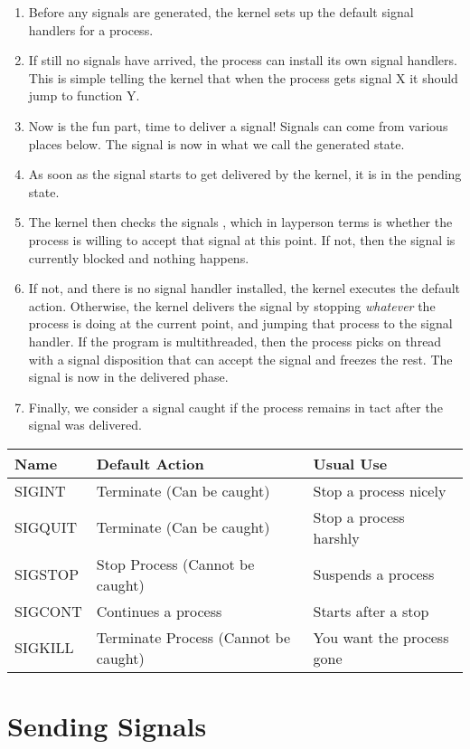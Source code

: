 \begin{enumerate}
\item Before any signals are generated, the kernel sets up the default signal handlers for a process.
\item If still no signals have arrived, the process can install its own signal handlers. This is simple telling the kernel that when the process gets signal X it should jump to function Y.
\item Now is the fun part, time to deliver a signal! Signals can come from various places below. The signal is now in what we call the generated state.
\item As soon as the signal starts to get delivered by the kernel, it is in the pending state.
\item The kernel then checks the signals , which in layperson terms is whether the process is willing to accept that signal at this point. If not, then the signal is currently blocked and nothing happens.
\item If not, and there is no signal handler installed, the kernel executes the default action. Otherwise, the kernel delivers the signal by stopping \textit{whatever} the process is doing at the current point, and jumping that process to the signal handler. If the program is multithreaded, then the process picks on thread with a signal disposition that can accept the signal and freezes the rest. The signal is now in the delivered phase.
\item Finally, we consider a signal caught if the process remains in tact after the signal was delivered.
\end{enumerate}

\begin{tabular}{|l|l|l|}
Name & Default Action & Usual Use \\ \hline
SIGINT & Terminate (Can be caught) & Stop a process nicely \\
SIGQUIT & Terminate (Can be caught) & Stop a process harshly \\
SIGSTOP & Stop Process (Cannot be caught) & Suspends a process \\
SIGCONT & Continues a process & Starts after a stop \\
SIGKILL & Terminate Process (Cannot be caught) & You want the process gone \\
\end{tabular}

\section{Sending Signals}

